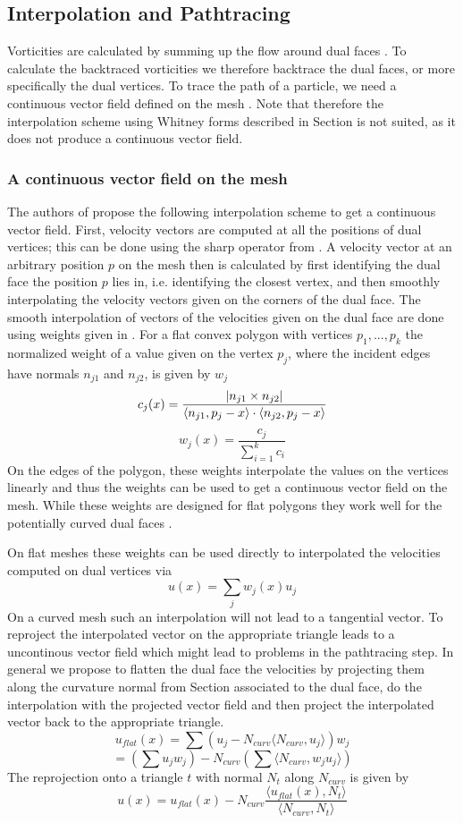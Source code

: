 \subsection{Interpolation and Pathtracing}
Vorticities are calculated by summing up the flow around dual faces . To calculate the backtraced vorticities we therefore backtrace the dual faces, or more specifically the dual vertices. To trace the path of a particle, we need a continuous vector field defined on the mesh . Note that therefore the interpolation scheme using Whitney forms described in Section  is not suited, as it does not produce a continuous vector field. 

\subsubsection{A continuous vector field on the mesh}
The authors of  propose the following interpolation scheme to get a  continuous vector field. First, velocity vectors are computed at all the positions of dual vertices; this can be done using the sharp operator from . A velocity vector at an arbitrary position $p$ on the mesh then is calculated by first identifying the dual face the position $p$ lies in, i.e. identifying the closest vertex,  and then smoothly interpolating the velocity vectors given on the corners of the dual face.
The smooth interpolation of vectors of the velocities given on the dual face are done using weights given in . For a flat convex polygon with vertices $p_1,...,p_k$ the normalized  weight of a value given on the vertex $p_j$, where the incident edges have normals $n_{j1}$ and $n_{j2}$, is given by $w_j$
\[c_j(x) = \frac{\left| n_{j1} \times n_{j2} \right|}{\langle n_{j1}, p_j -x\rangle\cdot\langle n_{j2}, p_j -x\rangle}\]
\[w_j(x) = \frac{c_j}{\sum_{i=1}^k c_i}\]
On the edges of the polygon, these weights interpolate the values on the vertices linearly and thus the weights can be used to get a continuous vector field on the mesh. While these weights are designed for flat polygons they work well for the potentially curved dual faces .

On flat meshes these weights can be used directly to interpolated the velocities computed on dual vertices via
\[u(x) = \sum_{j} w_j(x) u_j\] 
On a curved mesh such an interpolation will not lead to a tangential vector. To reproject the interpolated vector on the appropriate triangle leads to a uncontinous vector field which might lead to problems in the pathtracing step. In general we propose to  flatten  the dual face the velocities by projecting them along the curvature normal from Section  associated to the dual face, do the interpolation with the projected vector field and then project the interpolated vector back to the appropriate triangle. 
\[u_{flat}(x) = \sum (u_j - N_{curv} \langle N_{curv}, u_j \rangle) w_j\]
\[= (\sum u_j w_j )- N_{curv} (\sum \langle N_{curv}, w_j u_j \rangle)\]
The reprojection onto a triangle $t$ with normal $N_t$ along $N_{curv}$ is given by
\[u(x) = u_{flat}(x) - N_{curv} \frac{\langle u_{flat}(x), N_{t}\rangle}{ \langle N_{curv}, N_t \rangle}\]


